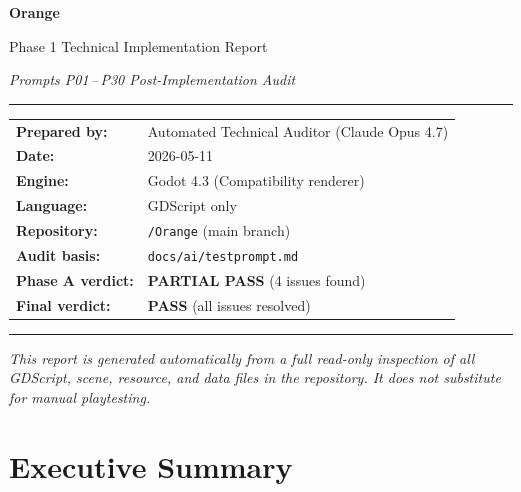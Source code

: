 \documentclass[12pt, a4paper]{article}
\begin{document}
\begin{titlepage}
  \centering
  \vspace*{2cm}
  {\Huge\bfseries\color{deepforest} Orange\par}
  \vspace{0.5cm}
  {\Large\color{mossgreen} Phase 1 Technical Implementation Report\par}
  \vspace{0.3cm}
  {\large\itshape Prompts P01\,--\,P30 Post-Implementation Audit\par}
  \vspace{2cm}
  \rule{0.6\linewidth}{1pt}\par
  \vspace{1cm}
  \begin{tabular}{ll}
    \textbf{Prepared by:}   & Automated Technical Auditor (Claude Opus 4.7) \\
    \textbf{Date:}          & 2026-05-11 \\
    \textbf{Engine:}        & Godot 4.3 (Compatibility renderer) \\
    \textbf{Language:}      & GDScript only \\
    \textbf{Repository:}    & \texttt{/Orange} (main branch) \\
    \textbf{Audit basis:}   & \texttt{docs/ai/testprompt.md} \\
    \textbf{Phase A verdict:} & \textcolor{highoran}{\textbf{PARTIAL PASS}} (4 issues found) \\
    \textbf{Final verdict:} & \textcolor{passgre}{\textbf{PASS}} (all issues resolved) \\
  \end{tabular}
  \vspace{2cm}
  \rule{0.6\linewidth}{0.4pt}\par
  \vspace{0.5cm}
  {\small\itshape This report is generated automatically from a full read-only
  inspection of all GDScript, scene, resource, and data files in the repository.
  It does not substitute for manual playtesting.\par}
\end{titlepage}

\tableofcontents
\newpage

\section{Executive Summary}
\end{document}
